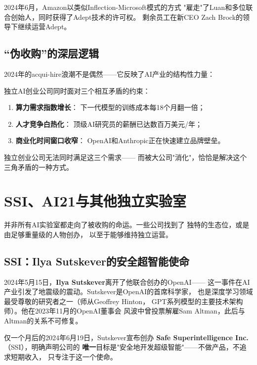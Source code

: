 2024年6月，Amazon以类似Inflection-Microsoft模式的方式
"雇走"了Luan和多位联合创始人，同时获得了Adept技术的许可权。
剩余员工在新CEO Zach Brock的领导下继续运营Adept。

\subsection{``伪收购''的深层逻辑}

2024年的acqui-hire浪潮不是偶然——它反映了AI产业的结构性力量：

\begin{keybox}
独立AI创业公司同时面对三个相互矛盾的约束：
\begin{enumerate}
  \item \textbf{算力需求指数增长}：
    下一代模型的训练成本每18个月翻一倍；
  \item \textbf{人才竞争白热化}：
    顶级AI研究员的薪酬已达数百万美元/年；
  \item \textbf{商业化时间窗口收窄}：
    OpenAI和Anthropic正在快速建立品牌壁垒。
\end{enumerate}
独立创业公司无法同时满足这三个需求——
而被大公司"消化"，恰恰是解决这个三角矛盾的一种方式。
\end{keybox}


\section{SSI、AI21与其他独立实验室}
\label{sec:other-labs}

并非所有AI实验室都走向了被收购的命运。一些公司找到了
独特的生态位，或是由足够重量级的人物创办，
以至于能够维持独立运营。

\subsection{SSI：Ilya Sutskever的安全超智能使命}

2024年5月15日，\textbf{Ilya Sutskever}离开了他联合创办的OpenAI——
这一事件在AI产业引发了地震级的震动。Sutskever是OpenAI的首席科学家，
也是深度学习领域最受尊敬的研究者之一（师从Geoffrey Hinton，
GPT系列模型的主要技术架构师）。他在2023年11月的OpenAI董事会
风波中曾投票解雇Sam Altman，此后与Altman的关系不可修复。

仅一个月后的2024年6月19日，Sutskever宣布创办
\textbf{Safe Superintelligence Inc.}（SSI），明确声明公司的
\textbf{唯一}目标是"安全地开发超级智能"——不做产品，不追求短期收入，
只专注于这一个使命。

